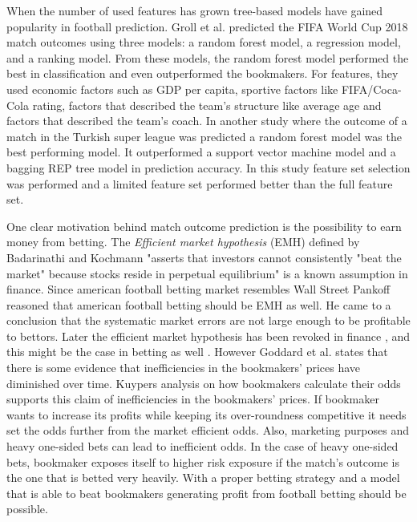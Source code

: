 When the number of used features has grown tree-based models have gained popularity in football prediction. Groll et al. \cite{groll2018prediction} predicted the FIFA World Cup 2018 match outcomes using three models: a random forest model, a regression model, and a ranking model. From these models, the random forest model performed the best in classification and even outperformed the bookmakers. For features, they used economic factors such as GDP per capita, sportive factors like FIFA/Coca-Cola rating, factors that described the team's structure like average age and factors that described the team's coach. In another study where the outcome of a match in the Turkish super league was predicted a random forest model was the best performing model. It outperformed a support vector machine model and a bagging REP tree model in prediction accuracy. In this study feature set selection was performed and a limited feature set performed better than the full feature set. \cite{10.1007/978-3-319-29504-6_48}

One clear motivation behind match outcome prediction is the possibility to earn money from betting. The \textit{Efficient market hypothesis} (EMH) defined by Badarinathi and Kochmann \cite{badarinathi1996football} "asserts that investors cannot consistently "beat the market" because stocks reside in perpetual equilibrium" is a known assumption in finance. Since american football betting market resembles Wall Street Pankoff \cite{pankoff1968market} reasoned that american football betting should be EMH as well. He came to a conclusion that the systematic market errors are not large enough to be profitable to bettors. Later the efficient market hypothesis has been revoked in finance \cite{jegadeesh1993returns}, and this might be the case in betting as well \cite{goddard2003modelling, badarinathi1996football}. However Goddard et al. \cite{goddard2003modelling} states that there is some evidence that inefficiencies in the bookmakers’ prices have diminished over time. Kuypers \cite{kuypers2008} analysis on how bookmakers calculate their odds supports this claim of inefficiencies in the bookmakers’ prices. If bookmaker wants to increase its profits while keeping its over-roundness competitive it needs set the odds further from the market efficient odds. Also, marketing purposes and heavy one-sided bets can lead to inefficient odds. In the case of heavy one-sided bets, bookmaker exposes itself to higher risk exposure if the match's outcome is the one that is betted very heavily. With a proper betting strategy and a model that is able to beat bookmakers generating profit from football betting should be possible.

